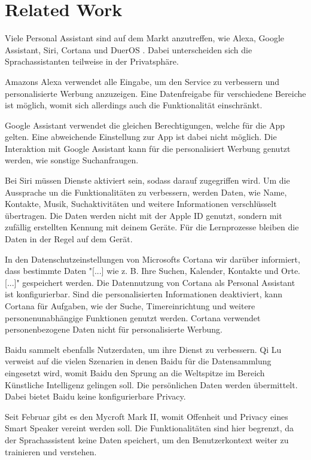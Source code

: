 \section{Related Work}

Viele Personal Assistant sind auf dem Markt anzutreffen, wie  Alexa, Google Assistant, Siri, Cortana und DuerOS\cite{alexaAssitent} \cite{googleAssistant} \cite{siriAssistent} \cite{cortanaAssistent}\cite{baiduAssistant}. Dabei unterscheiden sich die Sprachassistanten teilweise in der Privatsphäre. 

Amazons Alexa verwendet alle Eingabe, um den Service zu verbessern und personalisierte Werbung anzuzeigen\cite{alexaPrivacy}. Eine Datenfreigabe für verschiedene Bereiche ist möglich, womit sich allerdings auch die Funktionalität einschränkt. 

Google Assistant verwendet die gleichen Berechtigungen, welche für die App gelten\cite{googleShare}. Eine abweichende Einstellung zur App ist dabei nicht möglich. Die Interaktion mit Google Assistant kann für die personalisiert Werbung genutzt werden, wie sonstige Suchanfraugen\cite{googlePrivacy}. 

Bei Siri müssen Dienste aktiviert sein, sodass darauf zugegriffen wird\cite{siriPrivacy}. Um die Aussprache un die Funktionalitäten zu verbessern, werden Daten, wie Name, Kontakte, Musik, Suchaktivitäten und weitere Informationen verschlüsselt übertragen. Die Daten werden nicht mit der Apple ID genutzt, sondern mit zufällig erstellten Kennung mit deinem Geräte. Für die Lernprozesse bleiben die Daten in der Regel auf dem Gerät.

In den Datenschutzeinstellungen von Microsofts Cortana wir darüber informiert, dass bestimmte Daten "[...] wie z. B. Ihre Suchen, Kalender, Kontakte und Orte. [...]"\cite{cortanaAssistent} gespeichert werden. Die Datennutzung von Cortana als Personal Assistant ist konfigurierbar. Sind die personalisierten Informationen deaktiviert, kann Cortana für Aufgaben, wie der Suche, Timereinrichtung und weitere personenunabhängige Funktionen genutzt werden. Cortana verwendet personenbezogene Daten nicht für personalisierte Werbung.  

Baidu sammelt ebenfalls Nutzerdaten, um ihre Dienst zu verbessern. Qi Lu verweist auf die vielen Szenarien in denen Baidu für die Datensammlung eingesetzt wird, womit Baidu den Sprung an die Weltspitze im Bereich Künstliche Intelligenz gelingen soll\cite{baiduAI}. Die persönlichen Daten werden übermittelt. Dabei bietet Baidu keine konfigurierbare Privacy.

Seit Februar gibt es den Mycroft Mark II, womit Offenheit und Privacy eines Smart Speaker vereint werden soll\cite{mycroftsmartspeaker}. Die Funktionalitäten sind hier begrenzt, da der Sprachassistent keine Daten speichert, um den Benutzerkontext weiter zu trainieren und verstehen.
